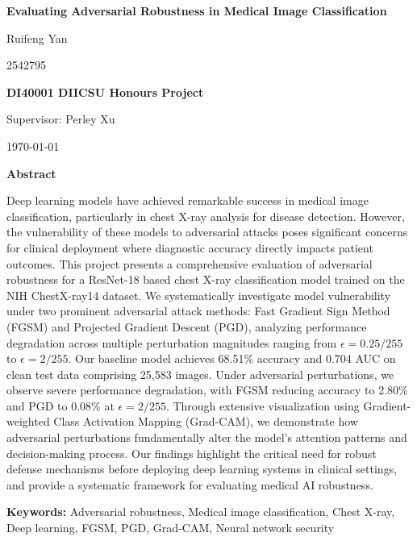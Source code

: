 \documentclass[12pt,a4paper]{article}
\newcommand{\projecttitle}{Evaluating Adversarial Robustness in Medical Image Classification}
\newcommand{\studentname}{Ruifeng Yan}
\newcommand{\studentid}{2542795}
\newcommand{\supervisor}{Perley Xu}
\renewenvironment{abstract}
    {\small
    \begin{center}
    \textbf{Abstract}
    \end{center}
    \quotation}
    {\endquotation}
\begin{document}
\begin{titlepage}
    \centering
    \vspace*{2cm}
    
    {\LARGE\textbf{\projecttitle}}\\
    \vspace{1cm}
    
    {\Large \studentname}\\
    \vspace{0.5cm}
    
    {\Large \studentid}\\
    \vspace{1cm}
    
    {\LARGE\textbf{DI40001 DIICSU Honours Project}}\\
    \vspace{1cm}
    
    {\Large Supervisor: \supervisor}\\
    \vspace{2cm}
    
    \vfill
    \today
\end{titlepage}

\begin{abstract}
Deep learning models have achieved remarkable success in medical image classification, particularly in chest X-ray analysis for disease detection. However, the vulnerability of these models to adversarial attacks poses significant concerns for clinical deployment where diagnostic accuracy directly impacts patient outcomes. This project presents a comprehensive evaluation of adversarial robustness for a ResNet-18 based chest X-ray classification model trained on the NIH ChestX-ray14 dataset. We systematically investigate model vulnerability under two prominent adversarial attack methods: Fast Gradient Sign Method (FGSM) and Projected Gradient Descent (PGD), analyzing performance degradation across multiple perturbation magnitudes ranging from $\epsilon=0.25/255$ to $\epsilon=2/255$. Our baseline model achieves 68.51\% accuracy and 0.704 AUC on clean test data comprising 25,583 images. Under adversarial perturbations, we observe severe performance degradation, with FGSM reducing accuracy to 2.80\% and PGD to 0.08\% at $\epsilon=2/255$. Through extensive visualization using Gradient-weighted Class Activation Mapping (Grad-CAM), we demonstrate how adversarial perturbations fundamentally alter the model's attention patterns and decision-making process. Our findings highlight the critical need for robust defense mechanisms before deploying deep learning systems in clinical settings, and provide a systematic framework for evaluating medical AI robustness.

\textbf{Keywords:} Adversarial robustness, Medical image classification, Chest X-ray, Deep learning, FGSM, PGD, Grad-CAM, Neural network security
\end{abstract}
\end{document}
